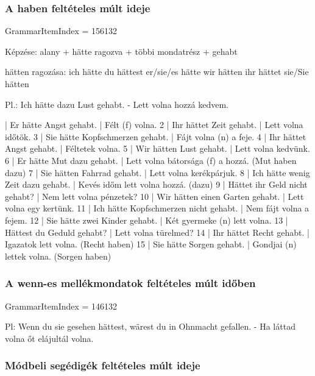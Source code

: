 \documentclass{article}
\newenvironment{desc}{\verbatim}{\endverbatim}
\newenvironment{exmp}{\verbatim}{\endverbatim}
\begin{document}
\subsubsection{A haben feltételes múlt ideje}

GrammarItemIndex = 156132

\begin{desc}
Képzése:
alany + hätte ragozva + többi mondatrész + gehabt

hätten ragozása:
ich hätte
du hättest
er/sie/es hätte
wir hätten
ihr hättet
sie/Sie hätten

Pl.: Ich hätte dazu Lust gehabt. - Lett volna hozzá kedvem.
\end{desc}

\begin{exmp}
1 | Er hätte Angst gehabt. | Félt (f) volna.
2 | Ihr hättet Zeit gehabt. | Lett volna időtök.
3 | Sie hätte Kopfschmerzen gehabt. | Fájt volna (n) a feje.
4 | Ihr hättet Angst gehabt. | Féltetek volna.
5 | Wir hätten Lust gehabt. | Lett volna kedvünk.
6 | Er hätte Mut dazu gehabt. | Lett volna bátorsága (f) a hozzá. (Mut haben dazu)
7 | Sie hätten Fahrrad gehabt. | Lett volna kerékpárjuk.
8 | Ich hätte wenig Zeit dazu gehabt. | Kevés időm lett volna hozzá. (dazu)
9 | Hättet ihr Geld nicht gehabt? | Nem lett volna pénzetek?
10 | Wir hätten einen Garten gehabt. | Lett volna egy kertünk.
11 | Ich hätte Kopfschmerzen nicht gehabt. | Nem fájt volna a fejem.
12 | Sie hätte zwei Kinder gehabt. | Két gyermeke (n) lett volna.
13 | Hättest du Geduld gehabt? | Lett volna türelmed?
14 | Ihr hättet Recht gehabt. | Igazatok lett volna. (Recht haben)
15 | Sie hätte Sorgen gehabt. | Gondjai (n) lettek volna. (Sorgen haben)
\end{exmp}

\subsubsection{A wenn-es mellékmondatok feltételes múlt időben}

GrammarItemIndex = 146132

\begin{desc}
Pl: Wenn du sie gesehen hättest, wärest du in Ohnmacht gefallen. - Ha láttad volna őt elájultál volna.
\end{desc}

\begin{exmp}
\end{exmp}

\subsubsection{Módbeli segédigék feltételes múlt ideje}
\end{document}
